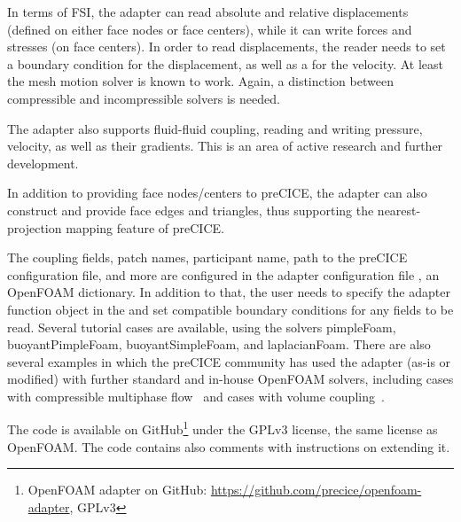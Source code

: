 In terms of FSI, the adapter can read absolute and relative displacements (defined on either face nodes or face centers), while it can write forces and stresses (on face centers).
In order to read displacements, the reader needs to set a  boundary condition for the displacement, as well as a 
for the velocity. At least the mesh motion solver  is known to work.
Again, a distinction between compressible and incompressible solvers is needed.

The adapter also supports fluid-fluid coupling, reading and writing pressure, velocity, as well as their gradients.
This is an area of active research and further development.

In addition to providing face nodes/centers to preCICE, the adapter can also construct and provide face edges and triangles,
thus supporting the nearest-projection mapping feature of preCICE.

The coupling fields, patch names, participant name, path to the preCICE configuration file, and more are configured
in the adapter configuration file , an OpenFOAM dictionary. %
In addition to that, the user needs to specify the adapter function object in the  and set compatible boundary conditions for any fields to be read.
Several tutorial cases are available, using the solvers pimpleFoam, buoyantPimpleFoam, buoyantSimpleFoam, and laplacianFoam.
There are also several examples in which the preCICE community has used the adapter (as-is or modified)
with further standard and in-house OpenFOAM solvers, including cases with compressible multiphase flow~\cite{Seufert2019_COUPLED}
and cases with volume coupling~\cite{Rousset2020_preCICE2020, Arya2020_preCICE2020, scheiblhofer2019coupling}.

The code is available on GitHub\footnote{OpenFOAM adapter on GitHub: \url{https://github.com/precice/openfoam-adapter}, GPLv3} under the GPLv3 license,
the same license as OpenFOAM. The code contains also comments with instructions on extending it.

